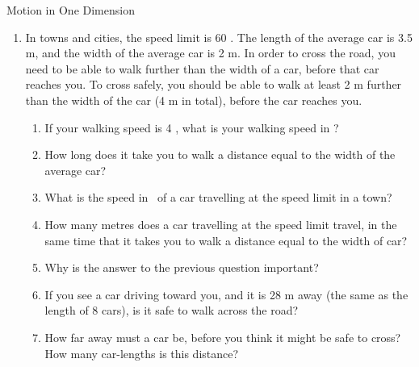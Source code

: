 \begin{eocexercises}{Motion in One Dimension}
\begin{enumerate}[noitemsep, label=\textbf{\arabic*}. ]
{\begin{enumerate}
\item{Use the graph to determine the following:}
	\begin{enumerate}
	\item{the speed 5 s after the start}
	\item{the distance travelled in Section A}
	\item{the acceleration in Section C}
	\end{enumerate} 
\item{At time t$_1$ the velocity-time graph intersects the time axis. Use an appropriate equation of motion to calculate the value of time t$_1$ (in s).}
\item{Sketch a displacement-time graph for the motion of the ball for these 12 s. (You do not need to calculate the actual values of the displacement for each time interval, but do pay attention to the general shape of this graph during each time interval.)}
\end{enumerate}}


\item In towns and cities, the speed limit is 60 \kph. The length of the average car is 3.5 m, and the width of the average car is 2 m. In order to cross the road, you need to be able to walk further than the width of a car, before that car reaches you. To cross safely, you should be able to walk at least 2 m further than the width of the car (4 m in total), before the car reaches you.
\begin{enumerate}
\item If your walking speed is 4 \kph, what is your walking speed in \ms?
\item How long does it take you to walk a distance equal to the width of the average car?
\item What is the speed in \ms\ of a car travelling at the speed limit in a town?
\item How many metres does a car travelling at the speed limit travel, in the same time that it takes you to walk a distance equal to the width of car?
\item Why is the answer to the previous question important?
\item If you see a car driving toward you, and it is 28 m away (the same as the length of 8 cars), is it safe to walk across the road?
\item How far away must a car be, before you think it might be safe to cross? How many car-lengths is this distance?
\end{enumerate}


\end{enumerate}
\end{eocexercises}
